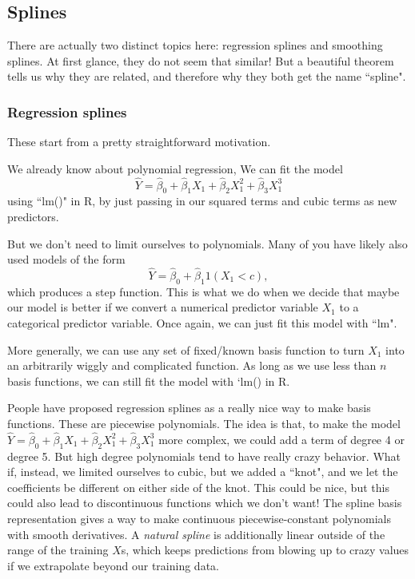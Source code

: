 \subsection{Splines}

There are actually two distinct topics here: regression splines and smoothing splines. At first glance, they do not seem that similar! But a beautiful theorem tells us why they are related, and therefore why they both get the name ``spline". 

\subsubsection{Regression splines}

These start from a pretty straightforward motivation. 

We already know about polynomial regression, We can fit the model 
$$
\hat{Y} = \hat{\beta}_0 + \hat{\beta}_1 X_1 + \hat{\beta}_2 X_1^2 + \hat{\beta}_3 X_1^3
$$
using ``lm()" in R, by just passing in our squared terms and cubic terms as new predictors. 

But we don't need to limit ourselves to polynomials. Many of you have likely also used models of the form
$$
\hat{Y} = \hat{\beta}_0 + \hat{\beta}_1 1(X_1  < c),
$$
which produces a step function. This is what we do when we decide that maybe our model is better if we convert a numerical predictor variable $X_1$ to a categorical predictor variable. Once again, we can just fit this model with ``lm". 

More generally, we can use any set of fixed/known basis function to turn $X_1$ into an arbitrarily wiggly and complicated function. As long as we use less than $n$ basis functions, we can still fit the model with `lm() in R.

People have proposed regression splines as a really nice way to make basis functions. These are piecewise polynomials. The idea is that, to make the model 
$
\hat{Y} = \hat{\beta}_0 + \hat{\beta}_1 X_1 + \hat{\beta}_2 X_1^2 + \hat{\beta}_3 X_1^3
$ more complex, we could add a term of degree 4 or degree 5. But high degree polynomials tend to have really crazy behavior. What if, instead, we limited ourselves to cubic, but we added a ``knot", and we let the coefficients be different on either side of the knot. 
This could be nice, but this could also lead to discontinuous functions which we don't want! The spline basis representation gives a way to make continuous piecewise-constant polynomials with smooth derivatives. A \emph{natural spline} is additionally linear outside of the range of the training $X$s, which keeps predictions from blowing up to crazy values if we extrapolate beyond our training data. 

